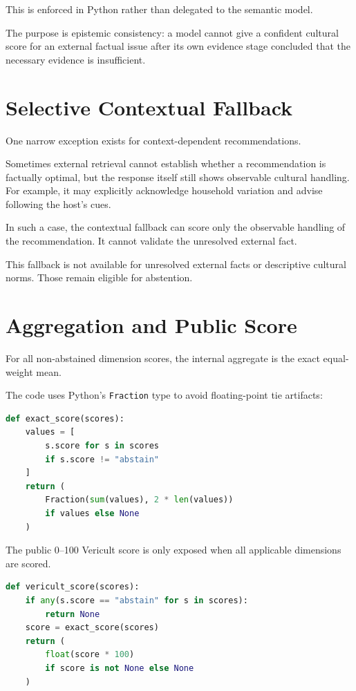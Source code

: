 This is enforced in Python rather than delegated to the semantic model.

The purpose is epistemic consistency: a model cannot give a confident cultural score for an external factual issue after its own evidence stage concluded that the necessary evidence is insufficient.

\section{Selective Contextual Fallback}

One narrow exception exists for context-dependent recommendations.

Sometimes external retrieval cannot establish whether a recommendation is factually optimal, but the response itself still shows observable cultural handling. For example, it may explicitly acknowledge household variation and advise following the host's cues.

In such a case, the contextual fallback can score only the observable handling of the recommendation. It cannot validate the unresolved external fact.

This fallback is not available for unresolved external facts or descriptive cultural norms. Those remain eligible for abstention.

\section{Aggregation and Public Score}

For all non-abstained dimension scores, the internal aggregate is the exact equal-weight mean.

The code uses Python's \texttt{Fraction} type to avoid floating-point tie artifacts:

\begin{lstlisting}[language=Python,caption={Exact aggregation from src/cultverify/scoring.py.}]
def exact_score(scores):
    values = [
        s.score for s in scores
        if s.score != "abstain"
    ]
    return (
        Fraction(sum(values), 2 * len(values))
        if values else None
    )
\end{lstlisting}

The public 0--100 Vericult score is only exposed when all applicable dimensions are scored.

\begin{lstlisting}[language=Python,caption={Public score suppression under abstention.}]
def vericult_score(scores):
    if any(s.score == "abstain" for s in scores):
        return None
    score = exact_score(scores)
    return (
        float(score * 100)
        if score is not None else None
    )
\end{lstlisting}

